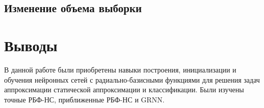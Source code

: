 
\subsection{Изменение объема выборки}


\section{Выводы}

В данной работе были приобретены навыки построения, инициализации и обучения нейронных сетей с радиально-базисными функциями для решения задач аппроксимации статической аппроксимации и классификации. Были изучены точные РБФ-НС, приближенные РБФ-НС и GRNN.

